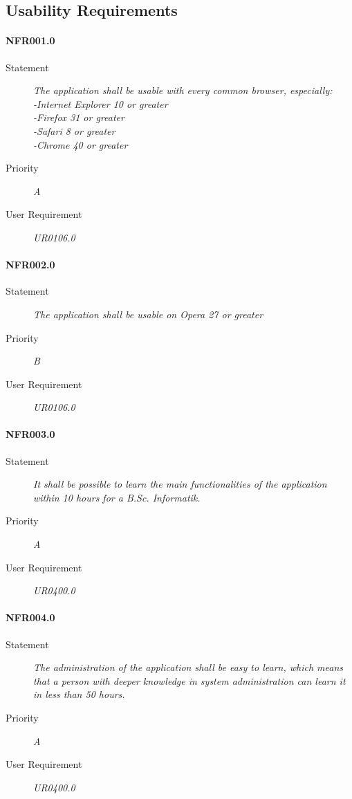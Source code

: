 \subsection{Usability Requirements}

\paragraph{NFR001.0}
\begin{description}
\item[Statement] \textit{
The application shall be usable with every common \gls{browser}, especially:
            \\-Internet Explorer 10 or greater
            \\-Firefox 31 or greater
			\\-Safari 8 or greater
			\\-Chrome 40 or greater 
}
\item[Priority] \textit{A}
\item[User Requirement] \textit{UR0106.0}
\end{description}

\paragraph{NFR002.0}
\begin{description}
\item[Statement] \textit{
The application shall be usable on Opera 27 or greater 
}
\item[Priority] \textit{B}
\item[User Requirement] \textit{UR0106.0}
\end{description}

\paragraph{NFR003.0}
\begin{description}
\item[Statement] \textit{
It shall be possible to learn the main functionalities of the application within 10 hours for a B.Sc. Informatik.
}
\item[Priority] \textit{A}
\item[User Requirement] \textit{UR0400.0}
\end{description}

\paragraph{NFR004.0}
\begin{description}
\item[Statement] \textit{
The administration of the application shall be easy to learn, which means that a person with deeper knowledge in system administration can learn it in less than 50 hours.
}
\item[Priority] \textit{A}
\item[User Requirement] \textit{UR0400.0}
\end{description}

